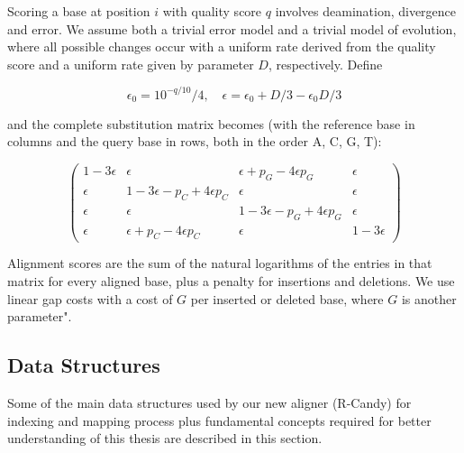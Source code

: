 \documentclass[11pt,a4paper]{report}
\begin{document}
Scoring a base at position $i$ with quality score $q$ involves
deamination, divergence and error.  We assume both a trivial error model
and a trivial model of evolution, where all possible changes occur with
a uniform rate derived from the quality score and a uniform rate given
by parameter $D$, respectively.  Define 

\begin{equation*}
\epsilon_0 = {10^{-q/10}}/4, \quad \epsilon = \epsilon_0 + D/3 - \epsilon_0 D/3
\end{equation*}

and the complete substitution matrix becomes (with the reference base in
columns and the
query base in rows, both in the order A, C, G, T):

\begin{equation*}
\left( \begin{array}{cccc}
1 - 3 \epsilon &       \epsilon                            &       \epsilon + p_{G} - 4 \epsilon p_{G} &       \epsilon \\
      \epsilon & 1 - 3 \epsilon - p_{C} + 4 \epsilon p_{C} &       \epsilon                            &       \epsilon \\
      \epsilon &       \epsilon                            & 1 - 3 \epsilon - p_{G} + 4 \epsilon p_{G} &       \epsilon \\
      \epsilon &       \epsilon + p_{C} - 4 \epsilon p_{C} &       \epsilon                            & 1 - 3 \epsilon 
\end{array} \right)
\end{equation*}

Alignment scores are the sum of the natural logarithms of the
entries in that matrix for every aligned base, plus a penalty for
insertions and deletions. We use linear gap costs with a cost of $G$
per inserted or deleted base, where $G$ is another parameter".




\subsection{Data Structures}  \label{Data Structures}

Some of the main data structures used by our new aligner (R-Candy)
for indexing and mapping process plus fundamental concepts required
for better understanding of this thesis are described in this section. 
\end{document}
